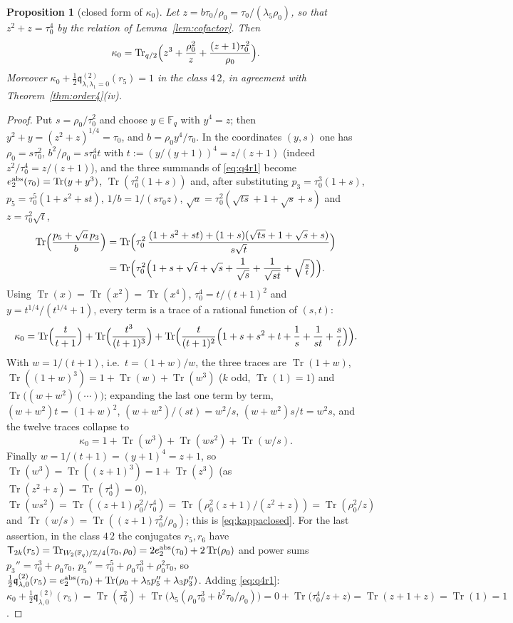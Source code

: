 \documentclass[12pt,a4paper]{amsart}
\newtheorem{proposition}[theorem]{Proposition}
\theoremstyle{definition}
\newcommand{\F}{\mathbb{F}}
\newcommand{\Z}{\mathbb{Z}}
\newcommand{\Tr}{\operatorname{Tr}}
\newcommand{\qq}{\mathfrak{q}}
\newcommand{\Tw}{\mathsf{T}}
\begin{document}
\begin{proposition}[closed form of $\kappa_0$]\label{prop:kappa}
Let $z=b\tau_0/\rho_0=\tau_0/(\lambda_5\rho_0)$, so that $z^2+z=\tau_0^4$ by the relation of Lemma~\ref{lem:cofactor}. Then
\begin{equation}\label{eq:kappaclosed}
\kappa_0=\Tr_{q/2}\Bigl(z^3+\frac{\rho_0^2}{z}+\frac{(z+1)\tau_0^2}{\rho_0}\Bigr).
\end{equation}
Moreover $\kappa_0+\frac12\qq^{(2)}_{\lambda,\lambda_1=0}(r_5)=1$ in the class $4\,2$, in agreement with Theorem~\ref{thm:order4}(iv).
\end{proposition}
\begin{proof}
Put $s=\rho_0/\tau_0^2$ and choose $y\in\F_q$ with $y^4=z$; then $y^2+y=(z^2+z)^{1/4}=\tau_0$, and $b=\rho_0y^4/\tau_0$. In the coordinates $(y,s)$ one has $\rho_0=s\tau_0^2$, $b^2/\rho_0=s\tau_0^4t$ with $t:=(y/(y+1))^4=z/(z+1)$ (indeed $z^2/\tau_0^4=z/(z+1)$), and the three summands of \eqref{eq:q4r1} become $e_2^{\rm abs}(\tau_0)=\Tr(y+y^3)$, $\Tr(\tau_0^2(1+s))$ and, after substituting $p_3=\tau_0^3(1+s)$, $p_5=\tau_0^5(1+s^2+st)$, $1/b=1/(s\tau_0z)$, $\sqrt a=\tau_0^2(\sqrt{ts}+1+\sqrt s+s)$ and $z=\tau_0^2\sqrt t$,
\begin{align*}
\Tr\Bigl(\frac{p_5+\sqrt a\,p_3}{b}\Bigr)&=\Tr\Bigl(\tau_0^2\,\frac{(1+s^2+st)+(1+s)(\sqrt{ts}+1+\sqrt s+s)}{s\sqrt t}\Bigr)\\
&=\Tr\Bigl(\tau_0^2\Bigl(1+s+\sqrt t+\sqrt s+\frac1{\sqrt s}+\frac1{\sqrt{st}}+\sqrt{\tfrac st}\Bigr)\Bigr).
\end{align*}
Using $\Tr(x)=\Tr(x^2)=\Tr(x^4)$, $\tau_0^4=t/(t+1)^2$ and $y=t^{1/4}/(t^{1/4}+1)$, every term is a trace of a rational function of $(s,t)$:
\[
\kappa_0=\Tr\Bigl(\frac t{t+1}\Bigr)+\Tr\Bigl(\frac{t^3}{(t+1)^3}\Bigr)+\Tr\Bigl(\frac{t}{(t+1)^2}\Bigl(1+s+s^2+t+\frac1s+\frac1{st}+\frac st\Bigr)\Bigr).
\]
With $w=1/(t+1)$, i.e.\ $t=(1+w)/w$, the three traces are $\Tr(1+w)$, $\Tr((1+w)^3)=1+\Tr(w)+\Tr(w^3)$ ($k$ odd, $\Tr(1)=1$) and $\Tr\bigl((w+w^2)(\cdots)\bigr)$; expanding the last one term by term, $(w+w^2)t=(1+w)^2$, $(w+w^2)/(st)=w^2/s$, $(w+w^2)s/t=w^2s$, and the twelve traces collapse to
\[
\kappa_0=1+\Tr(w^3)+\Tr(ws^2)+\Tr(w/s).
\]
Finally $w=1/(t+1)=(y+1)^4=z+1$, so $\Tr(w^3)=\Tr((z+1)^3)=1+\Tr(z^3)$ (as $\Tr(z^2+z)=\Tr(\tau_0^4)=0$), $\Tr(ws^2)=\Tr((z+1)\rho_0^2/\tau_0^4)=\Tr(\rho_0^2(z+1)/(z^2+z))=\Tr(\rho_0^2/z)$ and $\Tr(w/s)=\Tr((z+1)\tau_0^2/\rho_0)$; this is \eqref{eq:kappaclosed}. For the last assertion, in the class $4\,2$ the conjugates $r_5,r_6$ have $\Tw_{2k}(r_5)=\Tr_{W_2(\F_q)/\Z/4}(\tau_0,\rho_0)=2e_2^{\rm abs}(\tau_0)+2\Tr(\rho_0)$ and power sums $p_3''=\tau_0^3+\rho_0\tau_0$, $p_5''=\tau_0^5+\rho_0\tau_0^3+\rho_0^2\tau_0$, so $\frac12\qq^{(2)}_{\lambda,0}(r_5)=e_2^{\rm abs}(\tau_0)+\Tr(\rho_0+\lambda_5p_5''+\lambda_3p_3'')$. Adding \eqref{eq:q4r1}: $\kappa_0+\frac12\qq^{(2)}_{\lambda,0}(r_5)=\Tr(\tau_0^2)+\Tr\bigl(\lambda_5(\rho_0\tau_0^3+b^2\tau_0/\rho_0)\bigr)=0+\Tr\bigl(\tau_0^4/z+z\bigr)=\Tr(z+1+z)=\Tr(1)=1$.
\end{proof}
\end{document}
